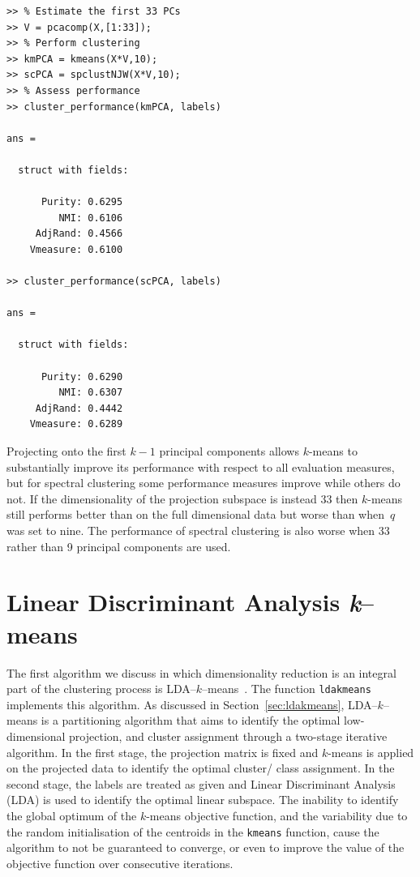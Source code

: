 \documentclass{book}
\begin{document}
\begin{verbatim}
>> % Estimate the first 33 PCs
>> V = pcacomp(X,[1:33]);
>> % Perform clustering
>> kmPCA = kmeans(X*V,10);
>> scPCA = spclustNJW(X*V,10);
>> % Assess performance
>> cluster_performance(kmPCA, labels)

ans = 

  struct with fields:

      Purity: 0.6295
         NMI: 0.6106
     AdjRand: 0.4566
    Vmeasure: 0.6100

>> cluster_performance(scPCA, labels)

ans = 

  struct with fields:

      Purity: 0.6290
         NMI: 0.6307
     AdjRand: 0.4442
    Vmeasure: 0.6289

\end{verbatim}


\noindent
%
Projecting onto the first $k-1$ principal components allows $k$-means to
substantially improve its performance with respect to all evaluation
measures, but for spectral clustering some performance measures improve
while others do not. If the
dimensionality of the projection subspace is instead 33 then $k$-means
still performs better than on the full dimensional data but worse than
when~$q$ was set to nine. The performance of spectral clustering is also
worse when 33 rather than 9 principal components are used.

\section{Linear Discriminant Analysis {\it k}--means}

The first algorithm we discuss in which dimensionality reduction is an
integral part of the clustering process is LDA--$k$--means~\cite{DingL2007}.
%
The function {\tt ldakmeans} implements this algorithm.
%
As discussed in Section~\ref{sec:ldakmeans}, LDA--$k$--means is a 
partitioning algorithm that aims to identify the optimal low-dimensional
projection, and cluster assignment through a two-stage
iterative algorithm. In the first stage, the projection matrix is fixed and
$k$-means is applied on the projected data to identify the optimal
cluster/ class assignment. In the second stage, the labels are treated as given
and Linear Discriminant Analysis (LDA) is used to identify the optimal linear
subspace.
%
The inability to identify the global optimum of the $k$-means objective
function, and the variability due to the random initialisation of the centroids
in the {\tt kmeans} function, cause
the algorithm to not be guaranteed to converge, or even to improve the value of the
objective function over consecutive iterations. 
\end{document}
